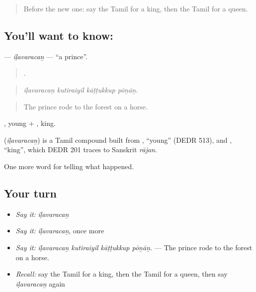 \begin{quote}
Before the new one: say the Tamil for a king, then the Tamil for a queen.
\end{quote}

\subsection*{You'll want to know: }
\textbf{} — \emph{iḷavaracaṉ} — \textquotedblleft{}a prince\textquotedblright{}.

\begin{quote}
   .
\end{quote}

\begin{quote}
\emph{iḷavaracaṉ kutiraiyil kāṭṭukkup pōṉāṉ.}
\end{quote}

\begin{quote}
The prince rode to the forest on a horse.
\end{quote}

, young + , king.

\begin{cousinweb}
\textbf{} (\emph{iḷavaracaṉ}) is a Tamil compound built from , \textquotedblleft{}young\textquotedblright{} (DEDR 513), and , \textquotedblleft{}king\textquotedblright{}, which DEDR 201 traces to Sanskrit \emph{rājan}.
\end{cousinweb}

\begin{grammarlens}[title={What you've built}]
One more word for telling what happened.
\end{grammarlens}

\subsection*{Your turn}
\begin{itemize}
\raggedright
  \item \emph{Say it:} \emph{iḷavaracaṉ}
  \item \emph{Say it:} \emph{iḷavaracaṉ}, once more
  \item \emph{Say it:} \emph{iḷavaracaṉ kutiraiyil kāṭṭukkup pōṉāṉ.} — The prince rode to the forest on a horse.
  \item \emph{Recall:} say the Tamil for a king, then the Tamil for a queen, then say \emph{iḷavaracaṉ} again
\end{itemize}

